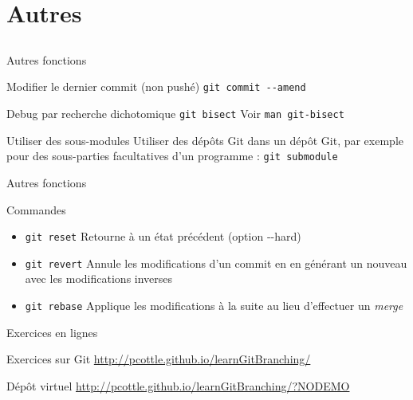\documentclass{beamer}
\begin{document}
\section{Autres}
\subsection{}

\begin{frame}[fragile]{Autres fonctions}
  \begin{block}{Modifier le dernier commit (non pushé)}
    \textcolor{commandcolor}{\verb?git commit --amend?}
  \end{block}
  \begin{block}{Debug par recherche dichotomique}
    \textcolor{commandcolor}{\verb?git bisect?}\newline
    Voir \textcolor{commandcolor}{\verb?man git-bisect?}
  \end{block}
  \begin{block}{Utiliser des sous-modules}
    Utiliser des dépôts Git dans un dépôt Git, par exemple pour des sous-parties facultatives d'un programme :\linebreak
    \textcolor{commandcolor}{\verb?git submodule?}
  \end{block}
\end{frame}

\begin{frame}[fragile]{Autres fonctions}
  \begin{block}{Commandes}
    \begin{itemize}
    \item \textcolor{commandcolor}{\verb?git reset?}\linebreak
      Retourne à un état précédent (option -{}-hard)
    \item \textcolor{commandcolor}{\verb?git revert?}\linebreak
      Annule les modifications d'un commit en en générant un nouveau avec les modifications inverses
    \item \textcolor{commandcolor}{\verb?git rebase?}\linebreak
      Applique les modifications à la suite au lieu d'effectuer un \textit{merge}
    \end{itemize}
  \end{block}
\end{frame}

\begin{frame}[fragile]{Exercices en lignes}
  \begin{exampleblock}{Exercices sur Git}
    \url{http://pcottle.github.io/learnGitBranching/}
  \end{exampleblock}
  \begin{block}{Dép\^ot virtuel}
    \url{http://pcottle.github.io/learnGitBranching/?NODEMO}
  \end{block}
\end{frame}
\end{document}
